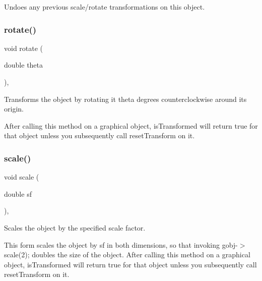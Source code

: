 Undoes any previous scale/rotate transformations on this object. 

\mbox{\label{classsgl_1_1GObject_ae1ffaa12185dfd5ba464f7d87c329e26}} 
\subsubsection{\texorpdfstring{rotate()}{rotate()}}
{\footnotesize\ttfamily void rotate (\begin{DoxyParamCaption}\item[{double}]{theta }\end{DoxyParamCaption})\hspace{0.3cm}{\ttfamily [virtual]}, {\ttfamily [inherited]}}



Transforms the object by rotating it {\ttfamily theta} degrees counterclockwise around its origin. 

After calling this method on a graphical object, {\ttfamily is\+Transformed} will return {\ttfamily true} for that object unless you subsequently call {\ttfamily reset\+Transform} on it. \mbox{\label{classsgl_1_1GObject_ad2e1900f730475c2d044817db03b38d6}} 
\subsubsection{\texorpdfstring{scale()}{scale()}\hspace{0.1cm}{\footnotesize\ttfamily [1/2]}}
{\footnotesize\ttfamily void scale (\begin{DoxyParamCaption}\item[{double}]{sf }\end{DoxyParamCaption})\hspace{0.3cm}{\ttfamily [virtual]}, {\ttfamily [inherited]}}



Scales the object by the specified scale factor. 

This form scales the object by {\ttfamily sf} in both dimensions, so that invoking {\ttfamily gobj-\/$>$scale(2);} doubles the size of the object. After calling this method on a graphical object, {\ttfamily is\+Transformed} will return {\ttfamily true} for that object unless you subsequently call {\ttfamily reset\+Transform} on it. \mbox{\label{classsgl_1_1GObject_a63641f69d610d0b951357d35a0c3b1e3}} 
